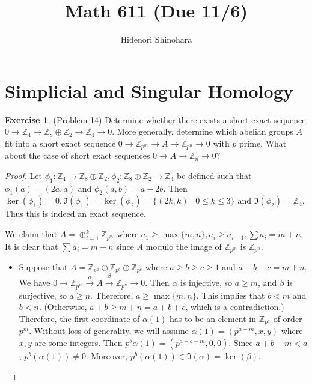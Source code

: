 \documentclass[12pt, psamsfonts]{amsart}
\theoremstyle{definition}
\newtheorem*{exer}{Exercise}
\theoremstyle{remark}
\numberwithin{equation}{section}
\begin{document}
\title{Math 611 (Due 11/6)}
\author{Hidenori Shinohara}
\maketitle

\section{Simplicial and Singular Homology}

\begin{exer}{(Problem 14)}
  Determine whether there exists a short exact sequence $0 \rightarrow \mathbb{Z}_4 \rightarrow \mathbb{Z}_8 \oplus \mathbb{Z}_2 \rightarrow \mathbb{Z}_4 \rightarrow 0$.
  More generally, determine which abelian groups $A$ fit into a short exact sequence $0 \rightarrow \mathbb{Z}_{p^m} \rightarrow A \rightarrow \mathbb{Z}_{p^n} \rightarrow 0$ with $p$ prime.
  What about the case of short exact sequences $0 \rightarrow A \rightarrow \mathbb{Z}_n \rightarrow 0$?
\end{exer}

\begin{proof}
  Let $\phi_1: \mathbb{Z}_4 \rightarrow \mathbb{Z}_8 \oplus \mathbb{Z}_2, \phi_2: \mathbb{Z}_8 \oplus \mathbb{Z}_2 \rightarrow \mathbb{Z}_4$ be defined such that $\phi_1(a) = (2a, a)$ and $\phi_2(a, b) = a + 2b$.
  Then $\ker(\phi_1) = 0, \Im(\phi_1) = \ker(\phi_2) = \{ (2k, k) \mid 0 \leq k \leq 3 \}$ and $\Im(\phi_2) = \mathbb{Z}_4$.
  Thus this is indeed an exact sequence.

  We claim that $A = \oplus_{i=1}^{k} \mathbb{Z}_{p^{a_i}}$ where $a_1 \geq \max\{ m, n \}, a_i \geq a_{i + 1}, \sum a_i = m + n$.
  It is clear that $\sum a_i = m + n$ since $A$ modulo the image of $\mathbb{Z}_{p^m}$ is $\mathbb{Z}_{p^n}$.
  \begin{itemize}
    \item
      Suppose that $A = \mathbb{Z}_{p^a} \oplus \mathbb{Z}_{p^b} \oplus \mathbb{Z}_{p^c}$ where $a \geq b \geq c \geq 1$ and $a + b + c = m + n$.
      We have $0 \rightarrow \mathbb{Z}_{p^m} \xrightarrow{\alpha} A \xrightarrow{\beta} \mathbb{Z}_{p^n} \rightarrow 0$. 
      Then $\alpha$ is injective, so $a \geq m$, and $\beta$ is surjective, so $a \geq n$.
      Therefore, $a \geq \max\{ m, n \}$.
      This implies that $b < m$ and $b < n$.
      (Otherwise, $a + b \geq m + n = a + b + c$, which is a contradiction.)
      Therefore, the first coordinate of $\alpha(1)$ has to be an element in $\mathbb{Z}_{p^a}$ of order $p^m$.
      Without loss of generality, we will assume $\alpha(1) = (p^{a - m}, x, y)$ where $x, y$ are some integers.
      Then $p^b\alpha(1) = (p^{a + b - m}, 0, 0)$.
      Since $a + b - m < a$, $p^b(\alpha(1)) \ne 0$.
      Moreover, $p^b(\alpha(1)) \in \Im(\alpha) = \ker(\beta)$.
  \end{itemize}

\end{proof}
\end{document}
